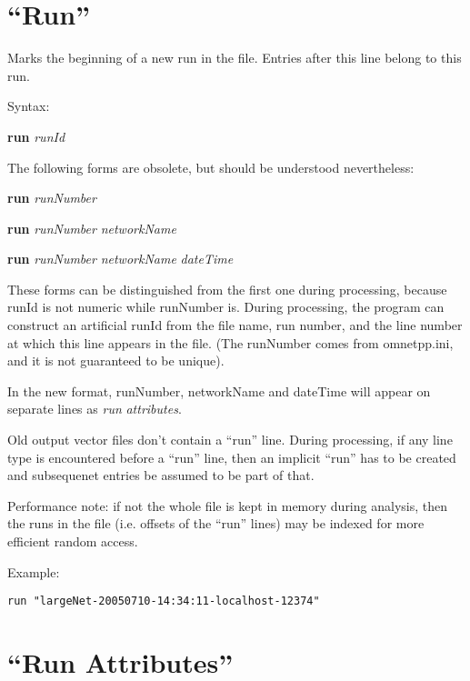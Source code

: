\section{``Run''}

Marks the beginning of a new run in the file. Entries after this line
belong to this run.

Syntax:

\hspace{20mm} \textbf{run} \textit{runId}

The following forms are obsolete, but should be understood nevertheless:

\hspace{20mm} \textbf{run} \textit{runNumber}

\hspace{20mm} \textbf{run} \textit{runNumber} \textit{networkName}

\hspace{20mm} \textbf{run} \textit{runNumber} \textit{networkName} \textit{dateTime}

These forms can be distinguished from the first one during processing,
because runId is not numeric while runNumber is. During processing, the
program can construct an artificial runId from the file name, run
number, and the line number at which this line appears in the file.
(The runNumber comes from omnetpp.ini, and it is not guaranteed to be
unique).

In the new format, runNumber, networkName and dateTime will appear on
separate lines as \textit{run} \textit{attributes}.

Old output vector files don't contain a ``run'' line. During processing,
if any line type is encountered before a ``run'' line, then an implicit
``run'' has to be created and subsequenet entries be assumed to be
part of that.

Performance note: if not the whole file is kept in memory during
analysis, then the runs in the file (i.e. offsets of the ``run'' lines)
may be indexed for more efficient random access.

Example:

\begin{verbatim}
run "largeNet-20050710-14:34:11-localhost-12374"
\end{verbatim}

\section{``Run Attributes''}

